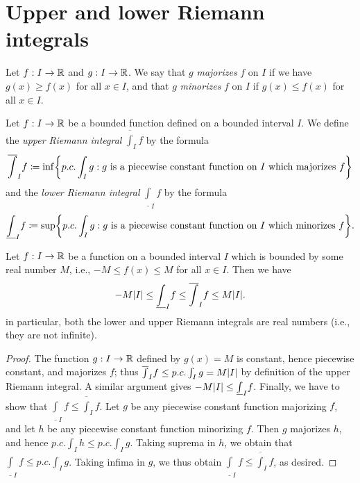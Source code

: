 \section{Upper and lower Riemann integrals}\label{sec:11.3}

\begin{defn}\label{11.3.1}
  Let \(f : I \to \mathbb{R}\) and \(g : I \to \mathbb{R}\).
  We say that \(g\) \emph{majorizes} \(f\) on \(I\) if we have \(g(x) \geq f(x)\) for all \(x \in I\), and that \(g\) \emph{minorizes} \(f\) on \(I\) if \(g(x) \leq f(x)\) for all \(x \in I\).
\end{defn}

\begin{defn}\label{11.3.2}
  Let \(f : I \to \mathbb{R}\) be a bounded function defined on a bounded interval \(I\).
  We define the \emph{upper Riemann integral} \(\overline{\int}_I f\) by the formula
  \[
    \overline{\int}_I f \coloneqq \inf\set{p.c. \int_I g : g \text{ is a piecewise constant function on \(I\) which majorizes } f}
  \]
  and the \emph{lower Riemann integral} \(\underline{\int}_I f\) by the formula
  \[
    \underline{\int}_I f \coloneqq \sup\set{p.c. \int_I g : g \text{ is a piecewise constant function on \(I\) which minorizes } f}.
  \]
\end{defn}

\begin{lem}\label{11.3.3}
  Let \(f : I \to \mathbb{R}\) be a function on a bounded interval \(I\) which is bounded by some real number \(M\), i.e., \(-M \leq f(x) \leq M\) for all \(x \in I\).
  Then we have
  \[
    -M \abs{I} \leq \underline{\int}_I f \leq \overline{\int}_I f \leq M \abs{I}.
  \]
  in particular, both the lower and upper Riemann integrals are real numbers (i.e., they are not infinite).
\end{lem}

\begin{proof}
  The function \(g : I \to \mathbb{R}\) defined by \(g(x) = M\) is constant, hence piecewise constant, and majorizes \(f\);
  thus \(\overline{\int}_I f \leq p.c. \int_I g = M \abs{I}\) by definition of the upper Riemann integral.
  A similar argument gives \(-M \abs{I} \leq \underline{\int}_I f\).
  Finally, we have to show that \(\underline{\int}_I f \leq \overline{\int}_I f\).
  Let \(g\) be any piecewise constant function majorizing \(f\), and let \(h\) be any piecewise constant function minorizing \(f\).
  Then \(g\) majorizes \(h\), and hence \(p.c. \int_I h \leq p.c. \int_I g\).
  Taking suprema in \(h\), we obtain that \(\underline{\int}_I f \leq p.c. \int_I g\).
  Taking infima in \(g\), we thus obtain \(\underline{\int}_I f \leq \overline{\int}_I f\), as desired.
\end{proof}

